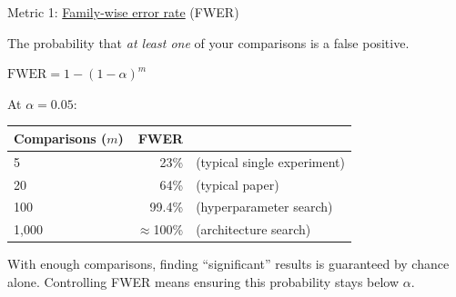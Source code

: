 \documentclass[aspectratio=169,11pt]{beamer}
\begin{document}
\begin{frame}{Metric 1: \href{https://en.wikipedia.org/wiki/Family-wise_error_rate}{Family-wise error rate} (FWER)}

{\small The probability that \emph{at least one} of your comparisons is a false positive.}

\vspace{0.5em}

\begin{center}
$\text{FWER} = 1 - (1 - \alpha)^m$
\end{center}

\vspace{0.5em}

{\small At $\alpha = 0.05$:}

\vspace{0.3em}

{\small
\begin{tabular}{lrl}
\toprule
\textbf{Comparisons ($m$)} & \textbf{FWER} & \\
\midrule
5 & 23\% & (typical single experiment) \\
20 & 64\% & (typical paper) \\
100 & 99.4\% & (hyperparameter search) \\
1,000 & $\approx$100\% & (architecture search) \\
\bottomrule
\end{tabular}
}

\vspace{0.5em}

{\small With enough comparisons, finding ``significant'' results is guaranteed by chance alone. Controlling FWER means ensuring this probability stays below $\alpha$.}
\end{frame}
\end{document}
